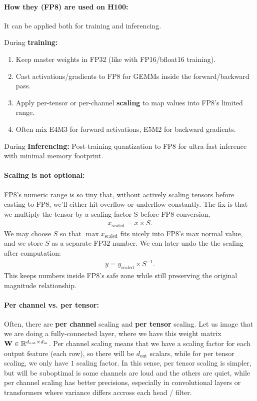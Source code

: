 \documentclass[11pt]{article}  %
\begin{document}
\paragraph{How they (FP8) are used on H100:} It can be applied both for training and inferencing.

During \textbf{training:}
\begin{enumerate}
  \item Keep master weights in FP32 (like with FP16/bfloat16 training).
  \item Cast activations/gradients to FP8 for GEMMs inside the forward/backward pass.
  \item Apply per-tensor or per-channel \textbf{scaling} to map values into FP8's limited range.
  \item Often mix E4M3 for forward activations, E5M2 for backward gradients.
\end{enumerate}

During \textbf{Inferencing:}
Post-training quantization to FP8 for ultra-fast inference with minimal memory footprint.

\paragraph{Scaling is not optional:} FP8's numeric range is so tiny that, without actively scaling tensors before casting to FP8, we'll either hit overflow or underflow constantly.
The fix is that we multiply the tensor by a scaling factor S before FP8 conversion,
\begin{align*}
  x_{\text{scaled}} = x \times S.
\end{align*}
We may choose $S$ so that $\max{x_{\text{scaled}} }$ fits nicely into FP8's max normal value, and we store $S$ as a separate FP32 number. We can later undo the the scaling after computation:
\begin{align*}
  y = y_{\text{scaled}} \times S^{-1}.
\end{align*}
This keeps numbers inside FP8's safe zone while still preserving the original magnitude relationship.

\paragraph{Per channel vs. per tensor:}
Often, there are \textbf{per channel} scaling and \textbf{per tensor} scaling. Let us image that we are doing a fully-connected layer, where we have this weight matrix $\mathbf{W} \in \mathbb{R}^{d_{\text{out}} \times d_{\text{in}}}$.
Per channel scaling means that we have a scaling factor for each output feature (each row), so there will be $d_{\text{out}}$ scalars, while for per tensor scaling, we only have $1$ scaling factor. In this sense, per tensor scaling is simpler, but will be suboptimal is some channels are loud and the others are quiet, while per channel scaling has better precisions, especially in convolutional layers or transformers where variance differs accross each head / filter.
\end{document}

